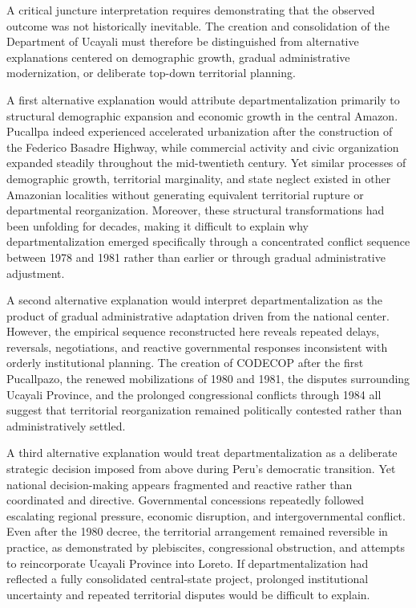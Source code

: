 \documentclass[12pt]{article}
\begin{document}
A critical juncture interpretation requires demonstrating that the observed outcome was not historically inevitable. The creation and consolidation of the Department of Ucayali must therefore be distinguished from alternative explanations centered on demographic growth, gradual administrative modernization, or deliberate top-down territorial planning.

A first alternative explanation would attribute departmentalization primarily to structural demographic expansion and economic growth in the central Amazon. Pucallpa indeed experienced accelerated urbanization after the construction of the Federico Basadre Highway, while commercial activity and civic organization expanded steadily throughout the mid-twentieth century. Yet similar processes of demographic growth, territorial marginality, and state neglect existed in other Amazonian localities without generating equivalent territorial rupture or departmental reorganization. Moreover, these structural transformations had been unfolding for decades, making it difficult to explain why departmentalization emerged specifically through a concentrated conflict sequence between 1978 and 1981 rather than earlier or through gradual administrative adjustment.


A second alternative explanation would interpret departmentalization as the product of gradual administrative adaptation driven from the national center. However, the empirical sequence reconstructed here reveals repeated delays, reversals, negotiations, and reactive governmental responses inconsistent with orderly institutional planning. The creation of CODECOP after the first Pucallpazo, the renewed mobilizations of 1980 and 1981, the disputes surrounding Ucayali Province, and the prolonged congressional conflicts through 1984 all suggest that territorial reorganization remained politically contested rather than administratively settled.

A third alternative explanation would treat departmentalization as a deliberate strategic decision imposed from above during Peru's democratic transition. Yet national decision-making appears fragmented and reactive rather than coordinated and directive. Governmental concessions repeatedly followed escalating regional pressure, economic disruption, and intergovernmental conflict. Even after the 1980 decree, the territorial arrangement remained reversible in practice, as demonstrated by plebiscites, congressional obstruction, and attempts to reincorporate Ucayali Province into Loreto. If departmentalization had reflected a fully consolidated central-state project, prolonged institutional uncertainty and repeated territorial disputes would be difficult to explain.
\end{document}
